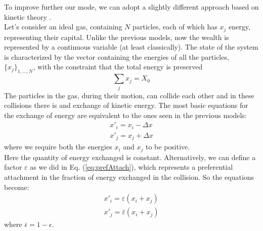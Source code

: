 To improve further our mode, we can adopt a slightly different approach based on kinetic theory \cite{econophysics}. \\
Let's consider an ideal gas, containing $N$ particles, each of which has $x_j$ energy, representing their capital.
Unlike the previous models, now the wealth is represented by a continuous variable (at least classically).
The state of the system is characterized by the vector containing the energies of all the particles, $\{x_j\}_{1,\ldots,N}$, with the constraint that the total energy is preserved
\begin{equation}
	\sum_j x_j = X_0
\end{equation}
The particles in the gas, during their motion, can collide each other and in these collisions there is and exchange of kinetic energy.
The most basic equations for the exchange of energy are equivalent to the ones seen in the previous models:
\begin{equation}
	\begin{split}
		x'_i = x_i - \Delta x \\
		x'_j = x_j + \Delta x 
	\end{split}
\end{equation}
where we require both the energies $x_i$ and $x_j$ to be positive. \\
Here the quantity of energy exchanged is constant.
Alternatively, we can define a factor $\varepsilon$ as we did in Eq. (\ref{eq:prefAttach}), which represents a preferential attachment in the fraction of energy exchanged in the collision.
So the equations become:
\begin{equation}
	\begin{split}
		x'_i = \varepsilon(x_i + x_j)	 \\
		x'_j = \bar{\varepsilon}(x_i + x_j)
	\end{split}
\end{equation}
where $\bar{\epsilon} = 1 - \epsilon$. \\

